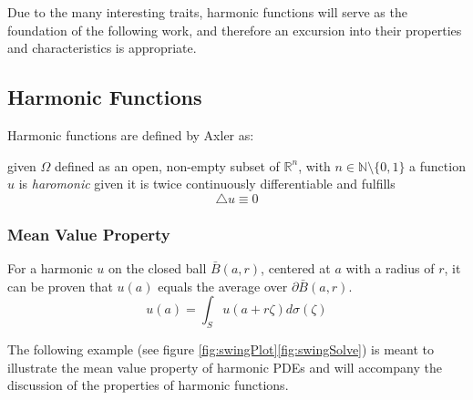 Due to the many interesting traits, harmonic functions will serve as the foundation of the
 following work, and therefore an excursion into their properties and characteristics
is appropriate.

\subsection{Harmonic Functions}\label{sssec:harmonics}
Harmonic functions are defined by Axler as:
\begin{definition} given $\Omega$ defined as an open, non-empty subset of
  $\mathbb{R}^{n}$, with $n \in \mathbb{N}\setminus \{0,1\}$
  a function $u$ is \textit{haromonic} given it is twice continuously differentiable
  and fulfills $$ \bigtriangleup u \equiv 0$$
\end{definition}


  \subsubsection{Mean Value Property}\label{sssec:meanvalue}
  For a harmonic $u$ on the closed ball $\bar{B}(a,r)$, centered at $a$ with a radius of $r$,
  it can be proven that $u(a)$ equals the average over $\partial \bar{B}(a,r)$\cite{Axler1992,Bornemann}.
\begin{equation}
  \tag{Mean Value Property}
  u(a) = \int_{S} u(a + r\zeta)d\sigma(\zeta)
  \label{eq:mean}
\end{equation}

The following example (see figure \ref{fig:swingPlot}\ref{fig:swingSolve}) is meant to illustrate
the mean value property of harmonic \Glspl{PDE} and will accompany the discussion
of the properties of harmonic functions.

